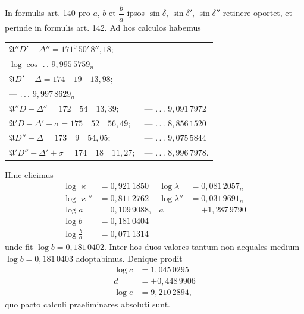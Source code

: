 In formulis art. 140 pro $a$, $b$ et $\dfrac b a$ ipsos $\sin\delta$, $\sin\delta'$, $\sin\delta''$ retinere oportet, et perinde in formulis art. 142. Ad hos calculos habemus
\begin{center}\begingroup\footnotesize\setlength{\tabcolsep}{4pt}\renewcommand{\arraystretch}{1.3}
\begin{tabular}{ll}
$\mathfrak A''D'-\Delta''=171^0\,50'\,8''{,}18;$ & \shortstack{$\log\sin$ .\,.\,. $9{,}152\,3306;$\\$\log\cos$ .\,. $9{,}995\,5759_n$}\\
$\mathfrak AD'-\Delta=174\quad19\quad13{,}98;$ & \shortstack{--- .\,.\,. $8{,}995\,4722;$\\--- .\,.\,. $9{,}997\,8629_n$}\\
$\mathfrak A''D-\Delta''=172\quad54\quad13{,}39;$ & --- .\,.\,. $9{,}091\,7972$\\
$\mathfrak A'D-\Delta'+\sigma=175\quad52\quad56{,}49;$ & --- .\,.\,. $8{,}856\,1520$\\
$\mathfrak AD''-\Delta=173\quad9\quad54{,}05;$ & --- .\,.\,. $9{,}075\,5844$\\
$\mathfrak A'D''-\Delta'+\sigma=174\quad18\quad11{,}27;$ & --- .\,.\,. $8{,}996\,7978$.
\end{tabular}\endgroup\end{center}
\noindent Hinc elicimus
\[
\begin{aligned}
\log\varkappa&=0{,}921\,1850&\log\lambda&=0{,}081\,2057_n\\
\log\varkappa''&=0{,}811\,2762&\log\lambda''&=0{,}031\,9691_n\\
\log a&=0{,}109\,9088,&a&=+1{,}287\,9790\\
\log b&=0{,}181\,0404&&\\
\log\frac b a&=0{,}071\,1314&&
\end{aligned}
\]
\noindent unde fit $\log b=0{,}181\,0402$. Inter hos duos valores tantum non aequales medium $\log b=0{,}181\,0403$ adoptabimus. Denique prodit
\[
\begin{aligned}
\log c&=1{,}045\,0295\\
d&=+0{,}448\,9906\\
\log e&=9{,}210\,2894,
\end{aligned}
\]
\noindent quo pacto calculi praeliminares absoluti sunt.

